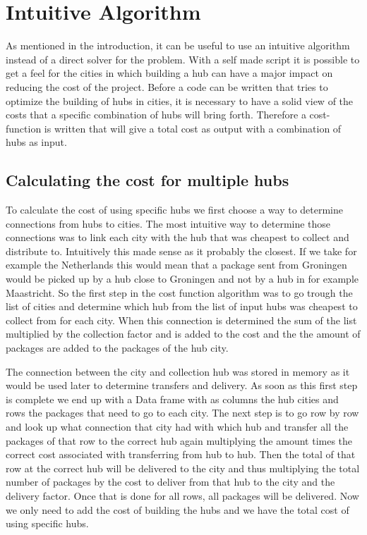 \documentclass{article}
\begin{document}
\newpage
\section{Intuitive Algorithm}
\label{Inuitive algorithms}
As mentioned in the introduction, it can be useful to use an intuitive algorithm instead of a direct solver for the problem. With a self made script it is possible to get a feel for the cities in which building a hub can have a major impact on reducing the cost of the project. 
Before a code can be written that tries to optimize the building of hubs in cities, it is necessary to have a solid view of the costs that a specific combination of hubs will bring forth. Therefore a cost-function is written that will give a total cost as output with a combination of hubs as input. 



    \subsection{Calculating the cost for multiple hubs}
        To calculate the cost of using specific hubs we first choose a way to determine connections from hubs to cities. The most intuitive way to determine those connections was to link each city with the hub that was cheapest to collect and distribute to. Intuitively this made sense as it probably the closest. If we take for example the Netherlands this would mean that a package sent from Groningen would be picked up by a hub close to Groningen and not by a hub in for example Maastricht. So the first step in the cost function algorithm was to go trough the list of cities and determine which hub from the list of input hubs was cheapest to collect from for each city. When this connection is determined the sum of the list multiplied by the collection factor and is added to the cost and the the amount of packages are added to the packages of the hub city. %
        
        The connection between the city and collection hub was stored in memory as it would be used later to determine transfers and delivery. As soon as this first step is complete we end up with a Data frame with as columns the hub cities and rows the packages that need to go to each city. The next step is to go row by row and look up what connection that city had with which hub and transfer all the packages of that row to the correct hub again multiplying the amount times the correct cost associated with transferring from hub to hub. Then the total of that row at the correct hub will be delivered to the city and thus multiplying the total number of packages by the cost to deliver from that hub to the city and the delivery factor. Once that is done for all rows, all packages will be delivered. Now we only need to add the cost of building the hubs and we have the total cost of using specific hubs. %
        
\end{document}
